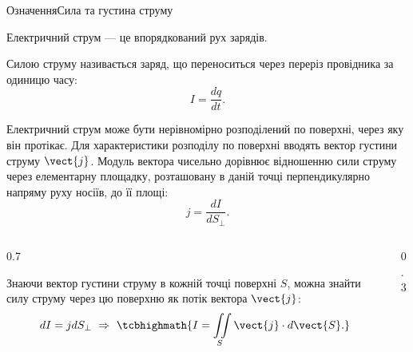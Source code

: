 \documentclass[onlytextwidth]{beamer}
\begin{document}
\begin{frame}{Означення}{Сила та густина струму}
	\begin{block}{}\justifying
		\alert{Електричний струм} --- це впорядкований рух зарядів.
	\end{block}
	\begin{block}{}\justifying
		\alert{Силою струму}  називається  заряд, що переноситься через переріз провідника за одиницю
		часу:
		\begin{equation*}
			I = \frac{dq}{dt}.
		\end{equation*}
	\end{block}
	\begin{overprint}
		\begin{block}{}\justifying
			Електричний струм може бути нерівномірно розподілений по поверхні, через яку він
			протікає. Для характеристики розподілу по поверхні вводять \alert{вектор густини струму}
			$\vect{j}$.
			Модуль вектора чисельно дорівнює відношенню сили струму через елементарну площадку,
			розташовану в даній точці перпендикулярно напряму руху носіїв, до її площі:
			\begin{equation*}
				j = \frac{dI}{dS_{\perp}}.
			\end{equation*}
		\end{block}
		\begin{columns}
			\begin{column}{0.7\linewidth}
				\begin{block}{}\justifying
					Знаючи вектор густини струму в кожній точці поверхні $S$, можна знайти силу струму
					через цю поверхню як потік вектора $\vect{j}$:
					\begin{equation*}
						dI = j dS_{\perp}\ \Rightarrow\ \tcbhighmath{ I = \iint\limits_S \vect{j}\cdot
							d\vect{S}.}
					\end{equation*}
				\end{block}
			\end{column}
			\quad
			\begin{column}{0.3\linewidth}\centering
				
			\end{column}
		\end{columns}
	\end{overprint}
\end{frame}
\end{document}

